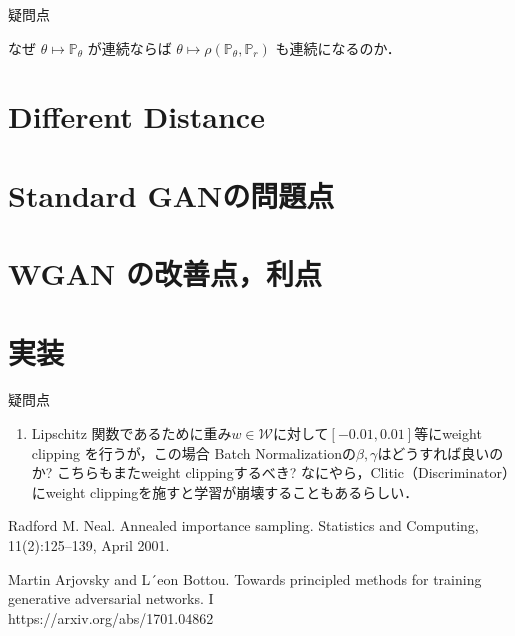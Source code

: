 \documentclass[uplatex, dvipdfmx]{jsarticle}
\theoremstyle{definition}
\begin{document}
\begin{itembox}[l]{疑問点}
\begin{enumerate}
            なぜ $\theta \longmapsto \mathbb{P}_{\theta}$ が連続ならば $\theta \longmapsto \rho (\mathbb{P}_{\theta}, \mathbb{P}_{r})$ も連続になるのか．

        \end{enumerate}
        
    \end{itembox}

    \section{Different Distance}

    \section{Standard GANの問題点}

    \section{WGAN の改善点，利点}

    \section{実装}
    \begin{itembox}[l]{疑問点}
        \begin{enumerate}
            \item Lipschitz 関数であるために重み$w \in \mathcal{W}$に対して$[-0.01, 0.01]$等にweight clipping を行うが，この場合
            Batch Normalizationの$\beta, \gamma$はどうすれば良いのか? こちらもまたweight clippingするべき?
            なにやら，Clitic（Discriminator）にweight clippingを施すと学習が崩壊することもあるらしい．
        \end{enumerate}
        

    \end{itembox}
    \newpage
    \begin{thebibliography}{10}
        Radford M. Neal. Annealed importance sampling. 
        Statistics and Computing, 11(2):125–139, April 2001.

        Martin Arjovsky and L´eon Bottou.
        Towards principled methods for training generative adversarial networks. I \\
        https://arxiv.org/abs/1701.04862
    \end{thebibliography}
    
    
\end{document}
